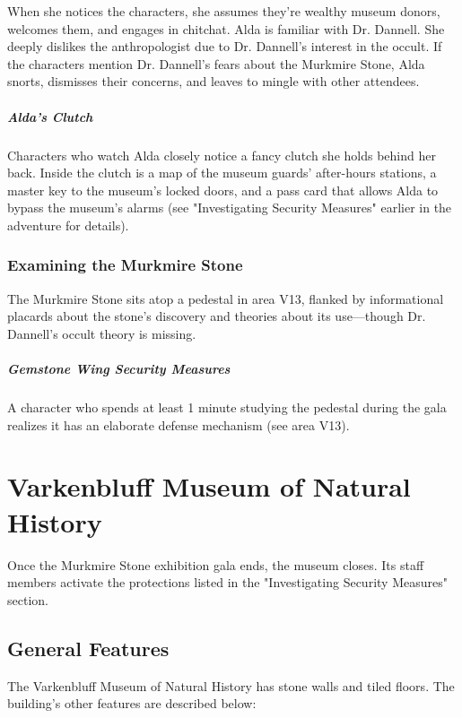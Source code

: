 \documentclass[10pt,a4paper,twoside,bg=print,twocolumn,openany,nodeprecatedcode]{dndbook}
\begin{document}
When she notices the characters, she assumes they're wealthy museum donors, welcomes them, and engages in chitchat. Alda is familiar with Dr. Dannell. She deeply dislikes the anthropologist due to Dr. Dannell's interest in the occult. If the characters mention Dr. Dannell's fears about the Murkmire Stone, Alda snorts, dismisses their concerns, and leaves to mingle with other attendees.

\subparagraph{Alda's Clutch}
Characters who watch Alda closely notice a fancy clutch she holds behind her back. Inside the clutch is a map of the museum guards' after-hours stations, a master key to the museum's locked doors, and a pass card that allows Alda to bypass the museum's alarms (see "Investigating Security Measures" earlier in the adventure for details).

\subsubsection{Examining the Murkmire Stone}
The Murkmire Stone sits atop a pedestal in area V13, flanked by informational placards about the stone's discovery and theories about its use—though Dr. Dannell's occult theory is missing.

\subparagraph{Gemstone Wing Security Measures}
A character who spends at least 1 minute studying the pedestal during the gala realizes it has an elaborate defense mechanism (see area V13).

\section{Varkenbluff Museum of Natural History}
Once the Murkmire Stone exhibition gala ends, the museum closes. Its staff members activate the protections listed in the "Investigating Security Measures" section.

\subsection{General Features}
The Varkenbluff Museum of Natural History has stone walls and tiled floors. The building's other features are described below:
\end{document}
